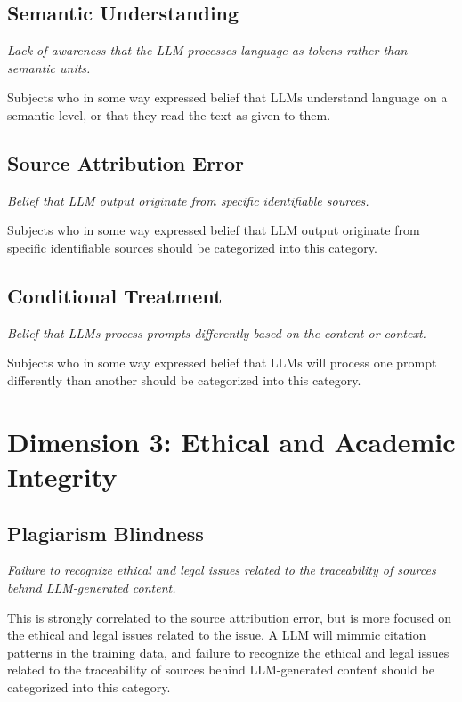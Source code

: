 \subsection*{Semantic Understanding}

\textit{Lack of awareness that the LLM processes language as tokens rather than semantic units.}

Subjects who in some way expressed belief that LLMs understand language on a semantic level, or that they read the text as given to them.

\subsection*{Source Attribution Error}

\textit{Belief that LLM output originate from specific identifiable sources.}

Subjects who in some way expressed belief that LLM output originate from specific identifiable sources should be categorized into this category.

\subsection*{Conditional Treatment}

\textit{Belief that LLMs process prompts differently based on the content or context.}

Subjects who in some way expressed belief that LLMs will process one prompt differently than another should be categorized into this category.

\section*{Dimension 3: Ethical and Academic Integrity}

\subsection*{Plagiarism Blindness}

\textit{Failure to recognize ethical and legal issues related to the traceability of sources behind LLM-generated content.}

This is strongly correlated to the source attribution error, but is more focused on the ethical and legal issues related to the issue. A LLM will mimmic citation patterns in the training data, and failure to recognize the ethical and legal issues related to the traceability of sources behind LLM-generated content should be categorized into this category.

